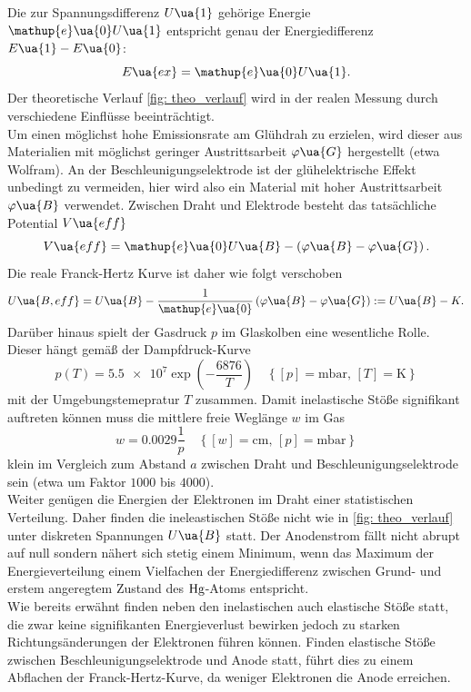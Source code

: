 Die zur Spannungsdifferenz $U\ua{1}$ gehörige
Energie $\mathup{e}\ua{0}U\ua{1}$ entspricht genau der Energiedifferenz $E\ua{1} - E\ua{0}$:
\begin{equation}
  \label{eq: anregungsenergie}
  E\ua{ex} = \mathup{e}\ua{0}U\ua{1}.
\end{equation}
Der theoretische
Verlauf \ref{fig: theo_verlauf} wird in der realen Messung durch verschiedene Einflüsse beeinträchtigt. \\
Um einen möglichst hohe Emissionsrate am Glühdrah zu erzielen, wird dieser aus Materialien mit möglichst geringer Austrittsarbeit $\varphi\ua{G}$ %
hergestellt (etwa Wolfram). An der Beschleunigungselektrode ist der glühelektrische Effekt unbedingt zu vermeiden, hier wird also
ein Material mit hoher Austrittsarbeit $\varphi\ua{B}$ verwendet. Zwischen Draht und Elektrode besteht das tatsächliche
Potential $V\ua{eff}$
\begin{equation}
  V\ua{eff} = \mathup{e}\ua{0} U\ua{B} - \left(\varphi\ua{B} - \varphi\ua{G}  \right).
\end{equation}
Die reale Franck-Hertz Kurve ist daher wie folgt verschoben
\begin{equation}
  \label{eq: effektivspannung}
  U\ua{B, eff} = U\ua{B} - \frac{1}{\mathup{e}\ua{0}}\left(\varphi\ua{B} - \varphi\ua{G}  \right) := U\ua{B}  - K.
\end{equation}
Darüber hinaus spielt der Gasdruck $p$ im Glaskolben eine wesentliche Rolle. Dieser hängt gemäß der Dampfdruck-Kurve
\begin{equation}
  \label{eq: dampfdruck}
  p(T) = \num{5.5e7}\exp \left( -\frac{6876}{T} \right) \quad \left\{[p] = \si{\milli\bar}, \, [T] = \si{\kelvin}\right\} %
\end{equation}
mit der Umgebungstemepratur $T$ zusammen. Damit inelastische Stöße signifikant auftreten können muss die mittlere
freie Weglänge $w$ im Gas
\begin{equation}
  \label{eq: weglaenge}
  w = 0.0029 \frac{1}{p} \quad \left\{[w] = \si{\centi\meter}, \, [p] = \si{\milli\bar} \right\}
\end{equation}
klein im Vergleich zum Abstand $a$ zwischen Draht und Beschleunigungselektrode sein (etwa um Faktor $1000$ bis $4000$). \\
Weiter genügen die Energien der Elektronen im Draht einer statistischen Verteilung. Daher finden die ineleastischen
Stöße nicht wie in \ref{fig: theo_verlauf} unter diskreten Spannungen $U\ua{B}$ statt. Der Anodenstrom fällt nicht abrupt
auf null sondern nähert sich stetig einem Minimum, wenn das Maximum der Energieverteilung einem Vielfachen der Energiedifferenz
zwischen Grund- und erstem angeregtem Zustand des $\ce{Hg}$-Atoms entspricht. \\
Wie bereits erwähnt finden neben den inelastischen auch elastische Stöße statt, die zwar keine signifikanten Energieverlust
bewirken jedoch zu starken Richtungsänderungen der Elektronen führen können. Finden elastische Stöße zwischen Beschleunigungselektrode
und Anode statt, führt dies zu einem Abflachen der Franck-Hertz-Kurve, da weniger Elektronen die Anode erreichen.
